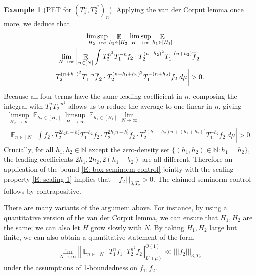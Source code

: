 \documentclass[11pt]{amsart}
\theoremstyle{definition}
\newtheorem{example}[lemma]{Example}
\DeclareMathOperator*{\E}{\mathbb{E}}
\newcommand{\N}{{\mathbb N}}
\newcommand{\norm}[1]{\left\Vert #1\right\Vert}
\newcommand{\nnorm}[1]{\lvert\!|\!| #1|\!|\!\rvert}
\newcommand{\1}{{\mathbf{1}}}
\newcommand{\abs}[1]{\mathopen{}\left| #1\mathclose{}\right|}
\begin{document}
\begin{example}[PET for $(T_1^n, T_2^{n^2})_n$]
    Applying the van der Corput lemma once more, we deduce that
        \begin{multline*}
        \limsup_{H_2\to\infty}\E_{h_2\in[H_2]}\limsup_{H_1\to\infty}\E_{h_1\in[H_1]}\\
        \lim_{N\to\infty}
        \left|\E_{n\in[N]}\int T_2^{n^2}T_1^{-n}f_2\cdot T_2^{(n+h_2)^2}T_1^{-(n+h_2)}\overline f_2\right.\\ 
        \left. \vphantom{\E_{n\in[N]}\int} T_2^{(n+h_1)^2}T_1^{-n}\overline f_2\cdot T_2^{(n+h_1+h_2)^2}T_1^{-(n+h_2)}f_2\; d\mu\right|>0.
    \end{multline*}
    Because all four terms have the same leading coefficient in $n$, composing the integral with $T_1^nT_2^{-n^2}$ allows us to reduce the average to one linear in $n$, giving
    \begin{multline*}
        \limsup_{H_2\to\infty}\E_{h_2\in[H_2]}\limsup_{H_1\to\infty}\E_{h_1\in[H_1]}\lim_{N\to\infty}\\
        \abs{\E_{n\in[N]}\int f_2\cdot T_2^{2h_2 n + h_2^2}T_1^{-h_2}\overline f_2\cdot T_2^{2h_1n + h_1^2}\overline f_2\cdot T_2^{2(h_1+h_2)n+(h_1+h_2)^2}T_1^{-h_2}f_2\; d\mu}>0.
    \end{multline*}
    Crucially, for all $h_1, h_2\in\N$ except the zero-density set $\{(h_1,h_2)\in\N\colon h_1 = h_2\}$, the leading coefficients $2h_1, 2h_2, 2(h_1+h_2)$ are all different. Therefore an application of the bound \eqref{E: box seminorm control} jointly with the scaling property \eqref{E: scaling 1} implies that $\nnorm{f_2}_{3, T_2} >0$. The claimed seminorm control follows by contrapositive.

    There are many variants of the argument above. For instance, by using a quantitative version of the van der Corput lemma, we can ensure that $H_1, H_2$ are the same; we can also let $H$ grow slowly with $N$. By taking $H_1, H_2$ large but finite, we can also obtain a quantitative statement of the form
     \begin{align*}
        \lim_{N\to\infty}\norm{\E_{n\in[N]}T_1^n f_1\cdot T_2^{n^2}f_2}_{L^2(\mu)}^{O(1)}\ll \nnorm{f_2}_{3, T_2}
    \end{align*}
    under the assumptions of 1-boundedness on $f_1, f_2$.
\end{example}
\end{document}
